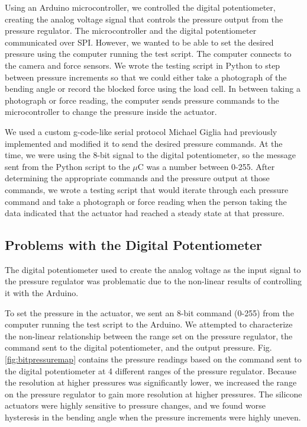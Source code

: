 Using an Arduino microcontroller, we controlled the digital potentiometer, creating the analog voltage signal that controls the pressure output from the pressure regulator. The microcontroller and the digital potentiometer communicated over SPI. However, we wanted to be able to set the desired pressure using the computer running the test script. The computer connects to the camera and force sensors. We wrote the testing script in Python to step between pressure increments so that we could either take a photograph of the bending angle or record the blocked force using the load cell. In between taking a photograph or force reading, the computer sends pressure commands to the microcontroller to change the pressure inside the actuator. 

We used a custom g-code-like serial protocol Michael Giglia had previously implemented and modified it to send the desired pressure commands. At the time, we were using the 8-bit signal to the digital potentiometer, so the message sent from the Python script to the $\mu$C was a number between 0-255. After determining the appropriate commands and the pressure output at those commands, we wrote a testing script that would iterate through each pressure command and take a photograph or force reading when the person taking the data indicated that the actuator had reached a steady state at that pressure. 

\subsection{Problems with the Digital Potentiometer}

The digital potentiometer used to create the analog voltage as the input signal to the pressure regulator was problematic due to the non-linear results of controlling it with the Arduino. 

To set the pressure in the actuator, we sent an 8-bit command (0-255) from the computer running the test script to the Arduino. We attempted to characterize the non-linear relationship between the range set on the pressure regulator, the command sent to the digital potentiometer, and the output pressure. Fig. \ref{fig:bitpressuremap} contains the pressure readings based on the command sent to the digital potentiometer at 4 different ranges of the pressure regulator. Because the resolution at higher pressures was significantly lower, we increased the range on the pressure regulator to gain more resolution at higher pressures. The silicone actuators were highly sensitive to pressure changes, and we found worse hysteresis in the bending angle when the pressure increments were highly uneven. 

